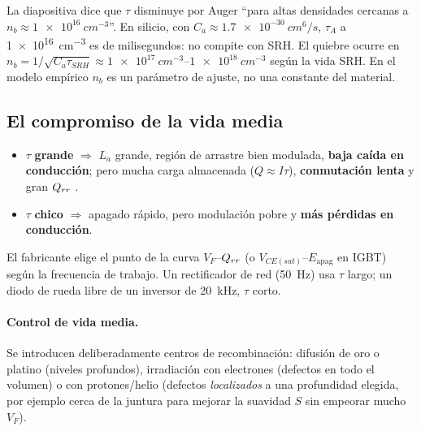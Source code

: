 \begin{ojo}
La diapositiva dice que $\tau$ disminuye por Auger ``para altas densidades cercanas a
$n_b\approx\SI{1e16}{cm^{-3}}$''. En silicio, con $C_a\approx\SI{1.7e-30}{cm^6/s}$, $\tau_A$ a
\SI{1e16}{cm^{-3}} es de milisegundos: no compite con SRH. El quiebre ocurre en
$n_b=1/\sqrt{C_a\tau_{SRH}}\approx\SIrange{1e17}{1e18}{cm^{-3}}$ según la vida SRH. En el modelo
empírico $n_b$ es un parámetro de ajuste, no una constante del material.
\end{ojo}

\subsection{El compromiso de la vida media}

\begin{intuicion}
\begin{itemize}
  \item $\tau$ \textbf{grande} $\Rightarrow$ $L_a$ grande, región de arrastre bien modulada,
  \textbf{baja caída en conducción}; pero mucha carga almacenada ($Q\approx I\tau$),
  \textbf{conmutación lenta} y gran $Q_{rr}$ .
  \item $\tau$ \textbf{chico} $\Rightarrow$ apagado rápido, pero modulación pobre y \textbf{más
  pérdidas en conducción}.
\end{itemize}
El fabricante elige el punto de la curva $V_F$--$Q_{rr}$ (o $V_{CE(sat)}$--$E_{\mathrm{apag}}$ en IGBT)
según la frecuencia de trabajo. Un rectificador de red (\SI{50}{Hz}) usa $\tau$ largo; un diodo de
rueda libre de un inversor de \SI{20}{kHz}, $\tau$ corto.
\end{intuicion}

\paragraph{Control de vida media.} Se introducen deliberadamente centros de recombinación:
difusión de oro o platino (niveles profundos), irradiación con electrones (defectos en todo el
volumen) o con protones/helio (defectos \emph{localizados} a una profundidad elegida, por ejemplo cerca
de la juntura para mejorar la suavidad $S$ sin empeorar mucho $V_F$).
